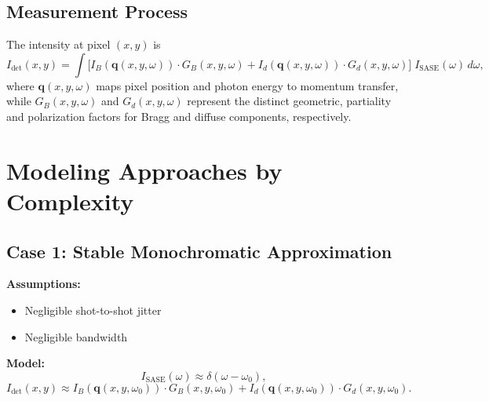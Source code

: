 \documentclass[12pt,a4paper]{article}
\begin{document}
\subsection{Measurement Process}
The intensity at pixel $(x,y)$ is
\begin{equation}
I_{\text{det}}(x,y) = \int \bigl[I_B(\mathbf{q}(x,y,\omega)) \cdot G_B(x,y,\omega) + I_d(\mathbf{q}(x,y,\omega)) \cdot G_d(x,y,\omega)\bigr]\; I_{\text{SASE}}(\omega)\, d\omega,
\end{equation}
where $\mathbf{q}(x,y,\omega)$ maps pixel position and photon energy to momentum transfer, while $G_B(x,y,\omega)$ and $G_d(x,y,\omega)$ represent the distinct geometric, partiality and polarization factors for Bragg and diffuse components, respectively.

\section{Modeling Approaches by Complexity}

\subsection{Case 1: Stable Monochromatic Approximation}
\textbf{Assumptions:}
\begin{itemize}
\item Negligible shot-to-shot jitter
\item Negligible bandwidth
\end{itemize}
\textbf{Model:}
\begin{equation}
I_{\text{SASE}}(\omega) \approx \delta(\omega - \omega_0),
\end{equation}
\begin{equation}
I_{\text{det}}(x,y) \approx I_B(\mathbf{q}(x,y,\omega_0)) \cdot G_B(x,y,\omega_0) + I_d(\mathbf{q}(x,y,\omega_0)) \cdot G_d(x,y,\omega_0).
\end{equation}
\end{document}

